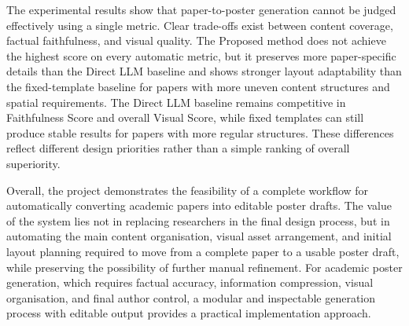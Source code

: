 \documentclass[12pt,oneside]{report}
\begin{document}
\vspace{1em}

The experimental results show that paper-to-poster generation cannot be judged effectively using a single metric. Clear trade-offs exist between content coverage, factual faithfulness, and visual quality. The Proposed method does not achieve the highest score on every automatic metric, but it preserves more paper-specific details than the Direct LLM baseline and shows stronger layout adaptability than the fixed-template baseline for papers with more uneven content structures and spatial requirements. The Direct LLM baseline remains competitive in Faithfulness Score and overall Visual Score, while fixed templates can still produce stable results for papers with more regular structures. These differences reflect different design priorities rather than a simple ranking of overall superiority.

\vspace{1em}

Overall, the project demonstrates the feasibility of a complete workflow for automatically converting academic papers into editable poster drafts. The value of the system lies not in replacing researchers in the final design process, but in automating the main content organisation, visual asset arrangement, and initial layout planning required to move from a complete paper to a usable poster draft, while preserving the possibility of further manual refinement. For academic poster generation, which requires factual accuracy, information compression, visual organisation, and final author control, a modular and inspectable generation process with editable output provides a practical implementation approach.




\cleardoublepage
{}
\renewcommand{\bibname}{References}


\end{document}
